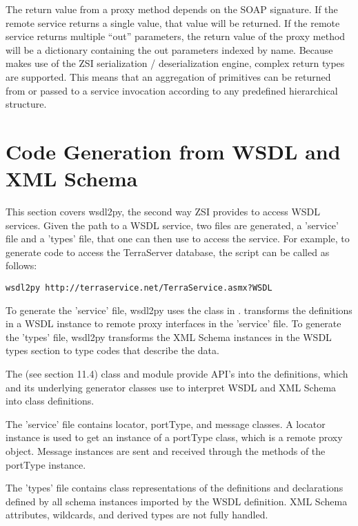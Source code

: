 The return value from a proxy method depends on the SOAP signature. If the 
remote service returns a single value, that value will be returned. If the 
remote service returns multiple ``out'' parameters, the return value of the 
proxy method will be a dictionary containing the out parameters indexed by 
name.  Because  makes use of the ZSI serialization / 
deserialization engine, complex return types are supported.  This means 
that an aggregation of primitives can be returned from or passed to a service
invocation according to any predefined hierarchical structure.


\section{Code Generation from WSDL and XML Schema}

This section covers wsdl2py, the second way ZSI provides to access WSDL
services.  Given the path to a WSDL service, two files are generated, a 
'service' file and a 'types' file, that one can then use to access the
service.  For example, to generate code to access the TerraServer database,
the script can be called as follows:

\begin{verbatim}
wsdl2py http://terraservice.net/TerraService.asmx?WSDL
\end{verbatim}

To generate the 'service' file, wsdl2py uses the 
class in .
 transforms the definitions in a WSDL instance
to remote proxy interfaces in the 'service' file.
To generate the 'types' file, wsdl2py transforms the XML Schema instances in
the WSDL types section to type codes that describe
the data.

The  (see section 11.4) class and 
module provide API's into the
definitions, which  and its underlying generator classes
use to interpret WSDL and XML Schema into class definitions.

The 'service' file contains locator, portType, and message classes.  
A locator instance is used to
get an instance of a portType class, which is a remote proxy object.
Message instances are sent and received through the methods of the
portType instance.

The 'types' file contains class representations of the definitions and
declarations defined by all schema instances imported by the WSDL definition.
XML Schema attributes, wildcards, and derived types are not fully
handled.

